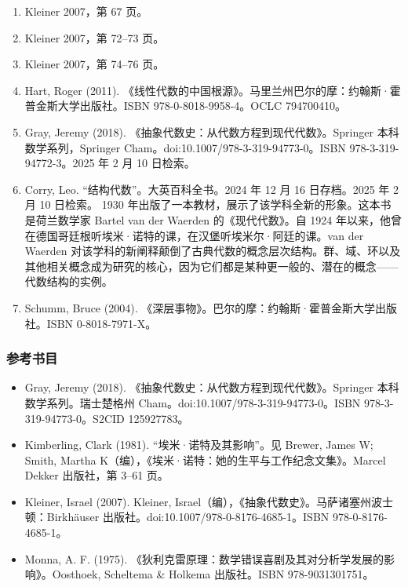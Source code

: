 \begin{enumerate}
\item Kleiner 2007，第 67 页。
\item Kleiner 2007，第 72–73 页。
\item Kleiner 2007，第 74–76 页。
\item Hart, Roger (2011). 《线性代数的中国根源》。马里兰州巴尔的摩：约翰斯·霍普金斯大学出版社。ISBN 978-0-8018-9958-4。OCLC 794700410。
\item Gray, Jeremy (2018). 《抽象代数史：从代数方程到现代代数》。Springer 本科数学系列，Springer Cham。doi:10.1007/978-3-319-94773-0。ISBN 978-3-319-94772-3。2025 年 2 月 10 日检索。
\item Corry, Leo. “结构代数”。大英百科全书。2024 年 12 月 16 日存档。2025 年 2 月 10 日检索。
    1930 年出版了一本教材，展示了该学科全新的形象。这本书是荷兰数学家 Bartel van der Waerden 的《现代代数》。自 1924 年以来，他曾在德国哥廷根听埃米·诺特的课，在汉堡听埃米尔·阿廷的课。van der Waerden 对该学科的新阐释颠倒了古典代数的概念层次结构。群、域、环以及其他相关概念成为研究的核心，因为它们都是某种更一般的、潜在的概念——代数结构的实例。
\item Schumm, Bruce (2004). 《深层事物》。巴尔的摩：约翰斯·霍普金斯大学出版社。ISBN 0-8018-7971-X。
\end{enumerate}
\subsubsection{参考书目}
\begin{itemize}
\item Gray, Jeremy (2018). 《抽象代数史：从代数方程到现代代数》。Springer 本科数学系列。瑞士楚格州 Cham。doi:10.1007/978-3-319-94773-0。ISBN 978-3-319-94773-0。S2CID 125927783。
\item Kimberling, Clark (1981). “埃米·诺特及其影响”。见 Brewer, James W; Smith, Martha K（编），《埃米·诺特：她的生平与工作纪念文集》。Marcel Dekker 出版社，第 3–61 页。
\item Kleiner, Israel (2007). Kleiner, Israel（编），《抽象代数史》。马萨诸塞州波士顿：Birkhäuser 出版社。doi:10.1007/978-0-8176-4685-1。ISBN 978-0-8176-4685-1。
\item Monna, A. F. (1975). 《狄利克雷原理：数学错误喜剧及其对分析学发展的影响》。Oosthoek, Scheltema & Holkema 出版社。ISBN 978-9031301751。
\end{itemize}

